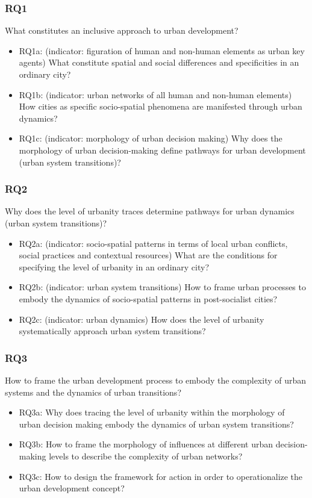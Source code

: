 \documentclass[11pt]{report}
\begin{document}
\subsubsection{RQ1}
What constitutes an inclusive approach to urban development?
\begin{itemize}
\item RQ1a: (indicator: figuration of human and non-human elements as urban key agents) What constitute spatial and social differences and specificities in an ordinary city? 
\item RQ1b: (indicator: urban networks of all human and non-human elements) How cities as specific socio-spatial phenomena are manifested through urban dynamics?
\item RQ1c: (indicator: morphology of urban decision making) Why does the morphology of urban decision-making define pathways for urban development (urban system transitions)?
\end {itemize}

\subsubsection{RQ2}
Why does the level of urbanity traces determine pathways for urban dynamics (urban system transitions)? 
\begin{itemize}
\item RQ2a: (indicator: socio-spatial patterns in terms of local urban conflicts, social practices and contextual resources) What are the conditions for specifying the level of urbanity in an ordinary city?
\item RQ2b: (indicator: urban system transitions) How to frame urban processes to embody the dynamics of socio-spatial patterns in post-socialist cities?
\item RQ2c: (indicator: urban dynamics) How does the level of urbanity systematically approach urban system transitions?
\end {itemize}

\subsubsection{RQ3}
How to frame the urban development process to embody the complexity of urban systems and the dynamics of urban transitions?
\begin{itemize}
\item RQ3a: Why does tracing the level of urbanity within the morphology of urban decision making embody the dynamics of urban system transitions?
\item RQ3b: How to frame the morphology of influences at different urban decision-making levels to describe the complexity of urban networks?
\item RQ3c: How to design the framework for action in order to operationalize the urban development concept?
\end {itemize}
\end{document}
